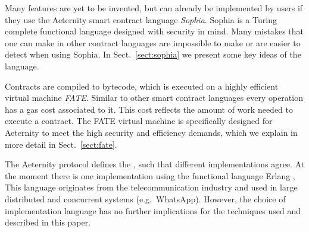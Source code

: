 Many features are yet to be invented, but can already be implemented
by users if they use the Aeternity smart contract language
\textit{Sophia}. Sophia is a Turing complete functional language
designed with security in mind. Many mistakes that one can make in
other contract languages are impossible to make or are easier to detect
when using Sophia. In Sect.\ \ref{sect:sophia} we present some key
ideas of the language.

Contracts are compiled to bytecode, which is executed on a highly
efficient virtual machine \textit{FATE}. Similar to other smart contract
languages every operation has a gas cost associated to it. This cost reflects
the amount of work needed to execute a contract. The FATE virtual machine is specifically designed for
Aeternity to meet the high security and efficiency demands, which we
explain in more detail in Sect.~\ref{sect:fate}.

The Aeternity protocol defines the \blockchain, such that
different implementations agree. At the moment there is one
implementation using the functional language Erlang
\cite{Armstrong:2010:ERL:1810891.1810910}, This language originates from the
telecommunication industry and used in large distributed and
concurrent systems (e.g.\ WhatsApp). However, the choice
of implementation language has no further
implications for the techniques used and described in this paper.
